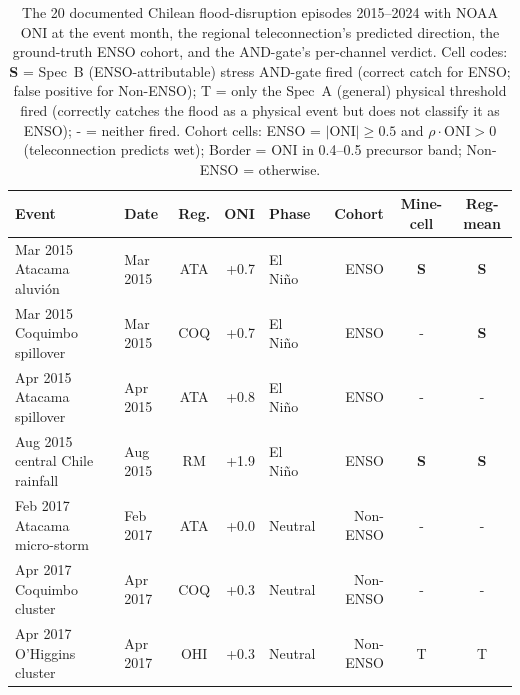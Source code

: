 \begin{table}[H]
\centering
\caption{The 20 documented Chilean flood-disruption episodes 2015--2024 with NOAA ONI at the event month, the regional teleconnection's predicted direction, the ground-truth ENSO cohort, and the AND-gate's per-channel verdict.  Cell codes: \textcolor{firesuccess}{\textbf{S}} = Spec~B (ENSO-attributable) stress AND-gate fired (correct catch for ENSO; false positive for Non-ENSO); \textcolor{firepartial}{T} = only the Spec~A (general) physical threshold fired (correctly catches the flood as a physical event but does not classify it as ENSO); \textcolor{firenone}{-} = neither fired.  Cohort cells: \textcolor{cohenso}{ENSO} = $|\text{ONI}|\geq 0.5$ and $\rho\cdot\text{ONI}>0$ (teleconnection predicts wet); \textcolor{cohbord}{Border} = ONI in 0.4--0.5 precursor band; \textcolor{cohnon}{Non-ENSO} = otherwise.}
\label{tab:validation-events}
\scriptsize
\setlength{\tabcolsep}{4pt}
\begin{tabular}{p{4.0cm}lcrlrcc}
\toprule
\textbf{Event} & \textbf{Date} & \textbf{Reg.} & \textbf{ONI} & \textbf{Phase} & \textbf{Cohort} & \textbf{Mine-cell} & \textbf{Reg-mean} \\
\midrule
Mar 2015 Atacama aluvi\'on & Mar 2015 & ATA & +0.7 & El Ni\~no & \textcolor{cohenso}{ENSO} & \textcolor{firesuccess}{\textbf{S}} & \textcolor{firesuccess}{\textbf{S}} \\
Mar 2015 Coquimbo spillover & Mar 2015 & COQ & +0.7 & El Ni\~no & \textcolor{cohenso}{ENSO} & \textcolor{firenone}{-} & \textcolor{firesuccess}{\textbf{S}} \\
Apr 2015 Atacama spillover & Apr 2015 & ATA & +0.8 & El Ni\~no & \textcolor{cohenso}{ENSO} & \textcolor{firenone}{-} & \textcolor{firenone}{-} \\
Aug 2015 central Chile rainfall & Aug 2015 & RM & +1.9 & El Ni\~no & \textcolor{cohenso}{ENSO} & \textcolor{firesuccess}{\textbf{S}} & \textcolor{firesuccess}{\textbf{S}} \\
Feb 2017 Atacama micro-storm & Feb 2017 & ATA & +0.0 & Neutral & \textcolor{cohnon}{Non-ENSO} & \textcolor{firenone}{-} & \textcolor{firenone}{-} \\
Apr 2017 Coquimbo cluster & Apr 2017 & COQ & +0.3 & Neutral & \textcolor{cohnon}{Non-ENSO} & \textcolor{firenone}{-} & \textcolor{firenone}{-} \\
Apr 2017 O'Higgins cluster & Apr 2017 & OHI & +0.3 & Neutral & \textcolor{cohnon}{Non-ENSO} & \textcolor{firepartial}{T} & \textcolor{firepartial}{T} \\

\end{tabular}
\end{table}
